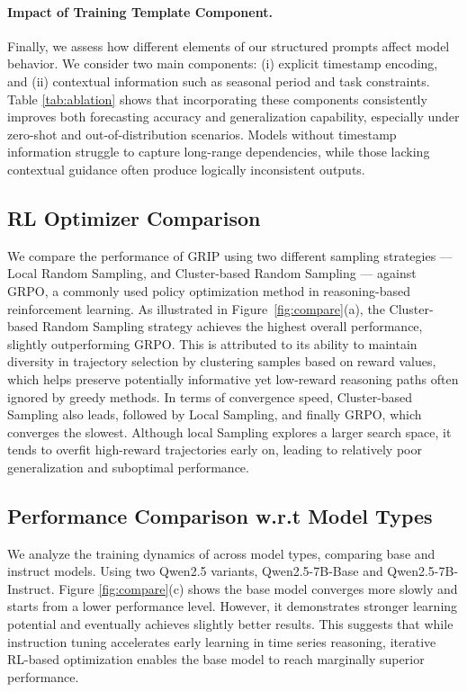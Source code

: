\paragraph{Impact of Training Template Component.}

Finally, we assess how different elements of our structured prompts affect model behavior. We consider two main components: (i) explicit timestamp encoding, and (ii) contextual information such as seasonal period and task constraints. Table \ref{tab:ablation} shows that incorporating these components consistently improves both forecasting accuracy and generalization capability, especially under zero-shot and out-of-distribution scenarios. Models without timestamp information struggle to capture long-range dependencies, while those lacking contextual guidance often produce logically inconsistent outputs. 

\subsection{RL Optimizer Comparison}


We compare the performance of GRIP using two different sampling strategies — Local Random Sampling, and Cluster-based Random Sampling — against GRPO, a commonly used policy optimization method in reasoning-based reinforcement learning. As illustrated in Figure~\ref{fig:compare}(a), the Cluster-based Random Sampling strategy achieves the highest overall performance, slightly outperforming GRPO. This is attributed to its ability to maintain diversity in trajectory selection by clustering samples based on reward values, which helps preserve potentially informative yet low-reward reasoning paths often ignored by greedy methods. In terms of convergence speed, Cluster-based Sampling also leads, followed by Local Sampling, and finally GRPO, which converges the slowest. Although local Sampling explores a larger search space, it tends to overfit high-reward trajectories early on, leading to relatively poor generalization and suboptimal performance.




\vspace{-0.04in}
\subsection{Performance Comparison w.r.t Model Types}

We analyze the training dynamics of \Ours across model types, comparing base and instruct models. Using two Qwen2.5 variants, Qwen2.5-7B-Base and Qwen2.5-7B-Instruct. Figure \ref{fig:compare}(c) shows the base model converges more slowly and starts from a lower performance level. However, it demonstrates stronger learning potential and eventually achieves slightly better results. This suggests that while instruction tuning accelerates early learning in time series reasoning, iterative RL-based optimization enables the base model to reach marginally superior performance.

